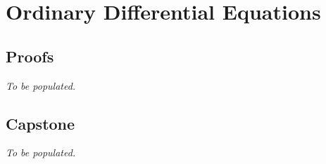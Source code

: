 \chapter{Ordinary Differential Equations}

\clearpage

\clearpage

\section*{Proofs}
\textit{To be populated.}

\section*{Capstone}
\textit{To be populated.}
